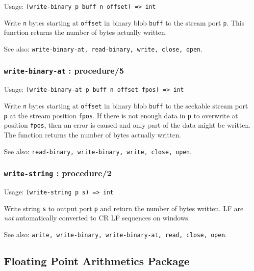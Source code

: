 \documentclass[
]{article}
\newcommand{\passthrough}[1]{#1}
\begin{document}
Usage: \passthrough{\lstinline!(write-binary p buff n offset) => int!}

Write \passthrough{\lstinline!n!} bytes starting at
\passthrough{\lstinline!offset!} in binary blob
\passthrough{\lstinline!buff!} to the stream port
\passthrough{\lstinline!p!}. This function returns the number of bytes
actually written.

See also:
\passthrough{\lstinline!write-binary-at, read-binary, write, close, open!}.

\hypertarget{write-binary-at-procedure5}{%
\subsubsection{\texorpdfstring{\texttt{write-binary-at} :
procedure/5}{write-binary-at : procedure/5}}\label{write-binary-at-procedure5}}

Usage:
\passthrough{\lstinline!(write-binary-at p buff n offset fpos) => int!}

Write \passthrough{\lstinline!n!} bytes starting at
\passthrough{\lstinline!offset!} in binary blob
\passthrough{\lstinline!buff!} to the seekable stream port
\passthrough{\lstinline!p!} at the stream position
\passthrough{\lstinline!fpos!}. If there is not enough data in
\passthrough{\lstinline!p!} to overwrite at position
\passthrough{\lstinline!fpos!}, then an error is caused and only part of
the data might be written. The function returns the number of bytes
actually written.

See also:
\passthrough{\lstinline!read-binary, write-binary, write, close, open!}.

\hypertarget{write-string-procedure2}{%
\subsubsection{\texorpdfstring{\texttt{write-string} :
procedure/2}{write-string : procedure/2}}\label{write-string-procedure2}}

Usage: \passthrough{\lstinline!(write-string p s) => int!}

Write string \passthrough{\lstinline!s!} to output port
\passthrough{\lstinline!p!} and return the number of bytes written. LF
are \emph{not} automatically converted to CR LF sequences on windows.

See also:
\passthrough{\lstinline!write, write-binary, write-binary-at, read, close, open!}.

\hypertarget{floating-point-arithmetics-package}{%
\subsection{Floating Point Arithmetics
Package}\label{floating-point-arithmetics-package}}
\end{document}
